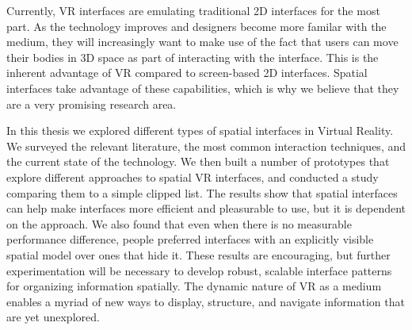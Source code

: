 \documentclass[nobib]{tufte-book} %
\begin{document}
Currently, VR interfaces are emulating traditional 2D interfaces for the most part. As the technology improves and designers become more familar with the medium, they will increasingly want to make use of the fact that users can move their bodies in 3D space as part of interacting with the interface. This is the inherent advantage of VR compared to screen-based 2D interfaces. Spatial interfaces take advantage of these capabilities, which is why we believe that they are a very promising research area.

In this thesis we explored different types of spatial interfaces in Virtual Reality. We surveyed the relevant literature, the most common interaction techniques, and the current state of the technology. We then built a number of prototypes that explore different approaches to spatial VR interfaces, and conducted a study comparing them to a simple clipped list. The results show that spatial interfaces can help make interfaces more efficient and pleasurable to use, but it is dependent on the approach. We also found that even when there is no measurable performance difference, people preferred interfaces with an explicitly visible spatial model over ones that hide it. These results are encouraging, but further experimentation will be necessary to develop robust, scalable interface patterns for organizing information spatially. The dynamic nature of VR as a medium enables a myriad of new ways to display, structure, and navigate information that are yet unexplored.



\backmatter




\printindex %
\end{document}
